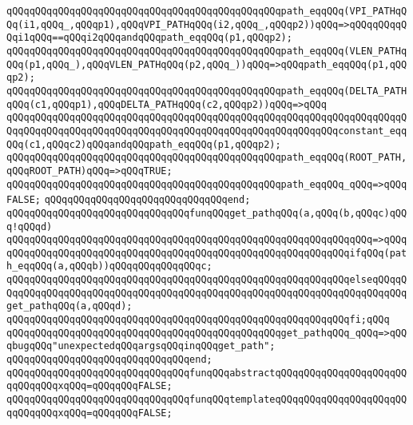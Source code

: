 \verb|qQQqqQQqqQQqqQQqqQQqqQQqqQQqqQQqqQQqqQQqqQQqqQQqpath_eqqQQq(VPI_PATHqQQq(i1,qQQq_,qQQqp1),qQQqVPI_PATHqQQq(i2,qQQq_,qQQqp2))qQQq=>qQQqqQQqqQQqi1qQQq==qQQqi2qQQqandqQQqpath_eqqQQq(p1,qQQqp2);|\newline
\verb|qQQqqQQqqQQqqQQqqQQqqQQqqQQqqQQqqQQqqQQqqQQqqQQqpath_eqqQQq(VLEN_PATHqQQq(p1,qQQq_),qQQqVLEN_PATHqQQq(p2,qQQq_))qQQq=>qQQqpath_eqqQQq(p1,qQQqp2);|\newline
\verb|qQQqqQQqqQQqqQQqqQQqqQQqqQQqqQQqqQQqqQQqqQQqqQQqpath_eqqQQq(DELTA_PATHqQQq(c1,qQQqp1),qQQqDELTA_PATHqQQq(c2,qQQqp2))qQQq=>qQQq|\newline
\verb|qQQqqQQqqQQqqQQqqQQqqQQqqQQqqQQqqQQqqQQqqQQqqQQqqQQqqQQqqQQqqQQqqQQqqQQqqQQqqQQqqQQqqQQqqQQqqQQqqQQqqQQqqQQqqQQqqQQqqQQqqQQqqQQqconstant_eqqQQq(c1,qQQqc2)qQQqandqQQqpath_eqqQQq(p1,qQQqp2);|\newline
\verb|qQQqqQQqqQQqqQQqqQQqqQQqqQQqqQQqqQQqqQQqqQQqqQQqpath_eqqQQq(ROOT_PATH,qQQqROOT_PATH)qQQq=>qQQqTRUE;|\newline
\verb|qQQqqQQqqQQqqQQqqQQqqQQqqQQqqQQqqQQqqQQqqQQqqQQqpath_eqqQQq_qQQq=>qQQqFALSE;|\newline
\verb|qQQqqQQqqQQqqQQqqQQqqQQqqQQqqQQqend;|\newline
\newline
\verb|qQQqqQQqqQQqqQQqqQQqqQQqqQQqqQQqfunqQQqget_pathqQQq(a,qQQq(b,qQQqc)qQQq!qQQqd)|\newline
\verb|qQQqqQQqqQQqqQQqqQQqqQQqqQQqqQQqqQQqqQQqqQQqqQQqqQQqqQQqqQQqqQQq=>qQQq|\newline
\verb|qQQqqQQqqQQqqQQqqQQqqQQqqQQqqQQqqQQqqQQqqQQqqQQqqQQqqQQqqQQqifqQQq(path_eqqQQq(a,qQQqb))qQQqqQQqqQQqqQQqc;|\newline
\verb|qQQqqQQqqQQqqQQqqQQqqQQqqQQqqQQqqQQqqQQqqQQqqQQqqQQqqQQqqQQqelseqQQqqQQqqQQqqQQqqQQqqQQqqQQqqQQqqQQqqQQqqQQqqQQqqQQqqQQqqQQqqQQqqQQqqQQqqQQqget_pathqQQq(a,qQQqd);|\newline
\verb|qQQqqQQqqQQqqQQqqQQqqQQqqQQqqQQqqQQqqQQqqQQqqQQqqQQqqQQqqQQqfi;qQQq|\newline
\newline
\verb|qQQqqQQqqQQqqQQqqQQqqQQqqQQqqQQqqQQqqQQqqQQqqQQqget_pathqQQq_qQQq=>qQQqbugqQQq"unexpectedqQQqargsqQQqinqQQqget_path";|\newline
\verb|qQQqqQQqqQQqqQQqqQQqqQQqqQQqqQQqend;|\newline
\newline
\verb|qQQqqQQqqQQqqQQqqQQqqQQqqQQqqQQqfunqQQqabstractqQQqqQQqqQQqqQQqqQQqqQQqqQQqqQQqxqQQq=qQQqqQQqFALSE;|\newline
\verb|qQQqqQQqqQQqqQQqqQQqqQQqqQQqqQQqfunqQQqtemplateqQQqqQQqqQQqqQQqqQQqqQQqqQQqqQQqxqQQq=qQQqqQQqFALSE;|\newline
